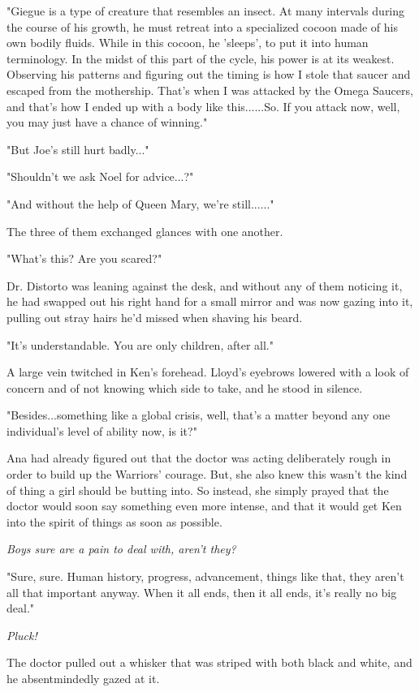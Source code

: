 \documentclass[
]{article}
\begin{document}
"Giegue is a type of creature that resembles an insect. At many
intervals during the course of his growth, he must retreat into a
specialized cocoon made of his own bodily fluids. While in this cocoon,
he 'sleeps', to put it into human terminology. In the midst of this part
of the cycle, his power is at its weakest. Observing his patterns and
figuring out the timing is how I stole that saucer and escaped from the
mothership. That's when I was attacked by the Omega Saucers, and that's
how I ended up with a body like this......So. If you attack now, well,
you may just have a chance of winning."

"But Joe's still hurt badly..."

"Shouldn't we ask Noel for advice...?"

"And without the help of Queen Mary, we're still......"

The three of them exchanged glances with one another.

"What's this? Are you scared?"

Dr. Distorto was leaning against the desk, and without any of them
noticing it, he had swapped out his right hand for a small mirror and
was now gazing into it, pulling out stray hairs he'd missed when shaving
his beard.

"It's understandable. You are only children, after all."

A large vein twitched in Ken's forehead. Lloyd's eyebrows lowered with a
look of concern and of not knowing which side to take, and he stood in
silence.

"Besides...something like a global crisis, well, that's a matter beyond
any one individual's level of ability now, is it?"

Ana had already figured out that the doctor was acting deliberately
rough in order to build up the Warriors' courage. But, she also knew
this wasn't the kind of thing a girl should be butting into. So instead,
she simply prayed that the doctor would soon say something even more
intense, and that it would get Ken into the spirit of things as soon as
possible.

\emph{Boys sure are a pain to deal with, aren't they?}

"Sure, sure. Human history, progress, advancement, things like that,
they aren't all that important anyway. When it all ends, then it all
ends, it's really no big deal."

\emph{Pluck!}

The doctor pulled out a whisker that was striped with both black and
white, and he absentmindedly gazed at it.
\end{document}
